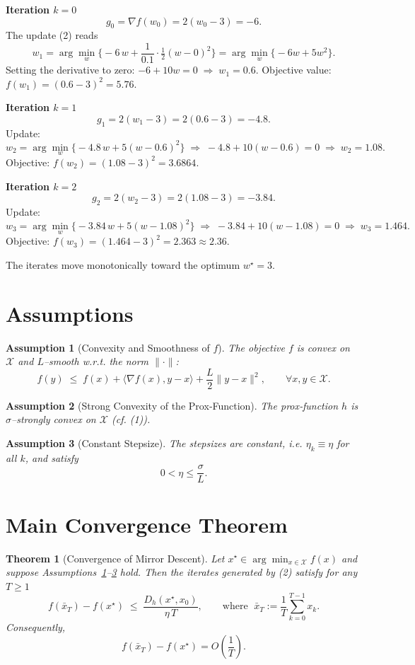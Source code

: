\documentclass{article}
\newtheorem{theorem}{Theorem}
\newtheorem{assumption}{Assumption}
\begin{document}
\medskip
\noindent\textbf{Iteration $k=0$}
\[
g_{0}= \nabla f(w_{0}) = 2(w_{0}-3) = -6.
\]
The update (2) reads
\[
w_{1}= \arg\min_{w}\Big\{-6\,w+\frac{1}{0.1}\cdot \tfrac12 (w-0)^{2}\Big\}
      = \arg\min_{w}\Big\{-6w+5w^{2}\Big\}.
\]
Setting the derivative to zero: $-6+10w=0\;\Rightarrow\;w_{1}=0.6$.
Objective value: $f(w_{1})=(0.6-3)^{2}=5.76$.

\medskip
\noindent\textbf{Iteration $k=1$}
\[
g_{1}=2(w_{1}-3)=2(0.6-3)=-4.8.
\]
Update:
\[
w_{2}= \arg\min_{w}\Big\{-4.8\,w+5(w-0.6)^{2}\Big\}
      \;\Longrightarrow\; -4.8+10(w-0.6)=0\;\Rightarrow\; w_{2}=1.08.
\]
Objective: $f(w_{2})=(1.08-3)^{2}=3.6864$.

\medskip
\noindent\textbf{Iteration $k=2$}
\[
g_{2}=2(w_{2}-3)=2(1.08-3)=-3.84.
\]
Update:
\[
w_{3}= \arg\min_{w}\Big\{-3.84\,w+5(w-1.08)^{2}\Big\}
      \;\Longrightarrow\; -3.84+10(w-1.08)=0\;\Rightarrow\; w_{3}=1.464.
\]
Objective: $f(w_{3})=(1.464-3)^{2}=2.363\approx2.36$.

The iterates move monotonically toward the optimum $w^{\star}=3$.

\newpage
\section*{Assumptions}
\begin{assumption}[Convexity and Smoothness of $f$]\label{ass:conv-smooth}
The objective $f$ is convex on $\mathcal X$ and $L$–smooth w.r.t. the norm $\|\cdot\|$:
\[
f(y)\;\le\;f(x)+\langle\nabla f(x),y-x\rangle+\frac{L}{2}\|y-x\|^{2},
\qquad\forall x,y\in\mathcal X. \tag{4}
\]
\end{assumption}

\begin{assumption}[Strong Convexity of the Prox‑Function]\label{ass:h-strong}
The prox‑function $h$ is $\sigma$–strongly convex on $\mathcal X$ (cf. (1)).
\end{assumption}

\begin{assumption}[Constant Stepsize]\label{ass:stepsize}
The stepsizes are constant, i.e. $\eta_{k}\equiv\eta$ for all $k$, and satisfy
\[
0<\eta\le \frac{\sigma}{L}.
\]
\end{assumption}

\section*{Main Convergence Theorem}
\begin{theorem}[Convergence of Mirror Descent]\label{thm:md}
Let $x^{\star}\in\arg\min_{x\in\mathcal X}f(x)$ and suppose Assumptions~\ref{ass:conv-smooth}–\ref{ass:stepsize} hold. Then the iterates generated by (2) satisfy for any $T\ge1$
\[
f(\bar x_{T})-f(x^{\star})\;\le\;\frac{D_{h}(x^{\star},x_{0})}{\eta\,T},
\qquad\text{where }\;\bar x_{T}:=\frac{1}{T}\sum_{k=0}^{T-1}x_{k}. \tag{5}
\]
Consequently,
\[
f(\bar x_{T})-f(x^{\star}) = O\!\left(\frac{1}{T}\right).
\]
\end{theorem}
\end{document}
